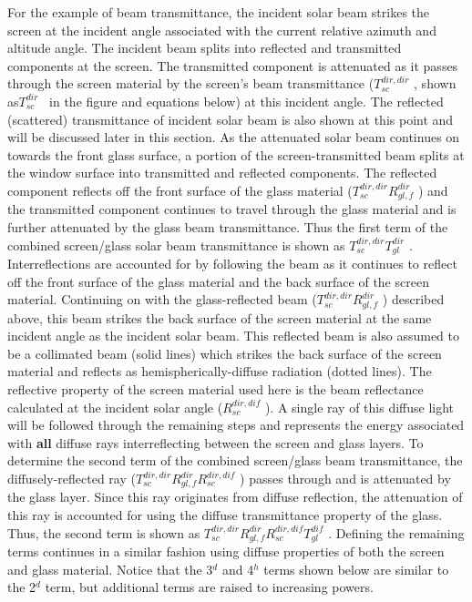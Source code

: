 For the example of beam transmittance, the incident solar beam strikes the screen at the incident angle associated with the current relative azimuth and altitude angle. The incident beam splits into reflected and transmitted components at the screen. The transmitted component is attenuated as it passes through the screen material by the screen's beam transmittance (\(T_{sc}^{dir,dir}\) , shown as\(T_{sc}^{dir}\) ~in the figure and equations below) at this incident angle. The reflected (scattered) transmittance of incident solar beam is also shown at this point and will be discussed later in this section. As the attenuated solar beam continues on towards the front glass surface, a portion of the screen-transmitted beam splits at the window surface into transmitted and reflected components. The reflected component reflects off the front surface of the glass material (\(T_{sc}^{dir,dir}R_{gl,f}^{dir}\) ) and the transmitted component continues to travel through the glass material and is further attenuated by the glass beam transmittance. Thus the first term of the combined screen/glass solar beam transmittance is shown as \(T_{sc}^{dir,dir}T_{gl}^{dir}\) . Interreflections are accounted for by following the beam as it continues to reflect off the front surface of the glass material and the back surface of the screen material. Continuing on with the glass-reflected beam (\(T_{sc}^{dir,dir}R_{gl,f}^{dir}\) ) described above, this beam strikes the back surface of the screen material at the same incident angle as the incident solar beam. This reflected beam is also assumed to be a collimated beam (solid lines) which strikes the back surface of the screen material and reflects as hemispherically-diffuse radiation (dotted lines). The reflective property of the screen material used here is the beam reflectance calculated at the incident solar angle (\(R_{sc}^{dir,dif}\) ). A single ray of this diffuse light will be followed through the remaining steps and represents the energy associated with \textbf{all} diffuse rays interreflecting between the screen and glass layers. To determine the second term of the combined screen/glass beam transmittance, the diffusely-reflected ray (\(T_{sc}^{dir,dir}R_{gl,f}^{dir}R_{sc}^{dir,dif}\) ) passes through and is attenuated by the glass layer. Since this ray originates from diffuse reflection, the attenuation of this ray is accounted for using the diffuse transmittance property of the glass. Thus, the second term is shown as \(T_{sc}^{dir,dir}R_{gl,f}^{dir}R_{sc}^{dir,dif}T_{gl}^{dif}\) . Defining the remaining terms continues in a similar fashion using diffuse properties of both the screen and glass material. Notice that the 3\(^{d}\) and 4\(^{h}\) terms shown below are similar to the 2\(^{d}\) term, but additional terms are raised to increasing powers.

